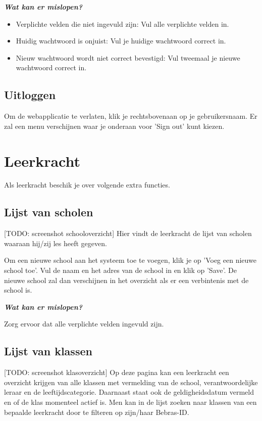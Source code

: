 \documentclass[]{article}
\begin{document}
\textbf{\textit{Wat kan er mislopen?}}

\begin{itemize}
\item Verplichte velden die niet ingevuld zijn: Vul alle verplichte velden in.
\item Huidig wachtwoord is onjuist: Vul je huidige wachtwoord correct in.
\item Nieuw wachtwoord wordt niet correct bevestigd: Vul tweemaal je nieuwe wachtwoord correct in.
\end{itemize}

\subsection{Uitloggen}
Om de webapplicatie te verlaten, klik je rechtsbovenaan op je gebruikersnaam. Er zal een menu verschijnen waar je onderaan voor 'Sign out' kunt kiezen.

\section{Leerkracht}

Als leerkracht beschik je over volgende extra functies.

\subsection{Lijst van scholen}

[TODO: screenshot schooloverzicht]
Hier vindt de leerkracht de lijst van scholen waaraan hij/zij les heeft gegeven.

Om een nieuwe school aan het systeem toe te voegen, klik je op 'Voeg een nieuwe school toe'. Vul de naam en het adres van de school in en klik op 'Save'. De nieuwe school zal dan verschijnen in het overzicht als er een verbintenis met de school is.

\textbf{\textit{Wat kan er mislopen?}}

Zorg ervoor dat alle verplichte velden ingevuld zijn.

\subsection{Lijst van klassen}

[TODO: screenshot klasoverzicht]
Op deze pagina kan een leerkracht een overzicht krijgen van alle klassen met vermelding van de school, verantwoordelijke leraar en de leeftijdscategorie. Daarnaast staat ook de geldigheidsdatum vermeld en of de klas momenteel actief is.
Men kan in de lijst zoeken naar klassen van een bepaalde leerkracht door te filteren op zijn/haar Bebras-ID.
\end{document}
